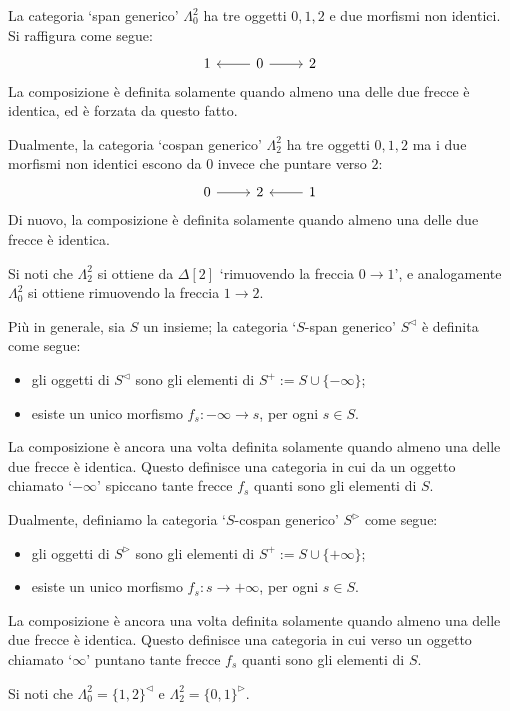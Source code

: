 \begin{example}\label{ex_spancospan}
La categoria `span generico' $\Lambda^2_0$ ha tre oggetti $0,1,2$ e due morfismi non identici. Si raffigura come segue:
\[\begin{tikzcd}
	1 & 0 \ar[r]\ar[l] & 2
\end{tikzcd}\]
La composizione è definita solamente quando almeno una delle due frecce è identica, ed è forzata da questo fatto.

Dualmente, la categoria `cospan generico' $\Lambda^2_2$ ha tre oggetti $0,1,2$ ma i due morfismi non identici escono da $0$ invece che puntare verso $2$:
\[\begin{tikzcd}
	0\ar[r] & 2 & 1\ar[l]
\end{tikzcd}\]
Di nuovo, la composizione è definita solamente quando almeno una delle due frecce è identica.

Si noti che $\Lambda^2_2$ si ottiene da $\Delta[2]$ `rimuovendo la freccia $0\to 1$', e analogamente $\Lambda^2_0$ si ottiene rimuovendo la freccia $1\to 2$.

Più in generale, sia $S$ un insieme; la categoria `$S$-span generico' $S^\lhd$ è definita come segue:
\begin{itemize}
	\item gli oggetti di $S^\lhd$ sono gli elementi di $S^+ := S\cup \{-\infty\}$;
	\item esiste un unico morfismo $f_s : -\infty\to s$, per ogni $s\in S$.
\end{itemize}
La composizione è ancora una volta definita solamente quando almeno una delle due frecce è identica. Questo definisce una categoria in cui da un oggetto chiamato `$-\infty$' spiccano tante frecce $f_s$ quanti sono gli elementi di $S$.

Dualmente, definiamo la categoria `$S$-cospan generico' $S^\rhd$ come segue:
\begin{itemize}
	\item gli oggetti di $S^\rhd$ sono gli elementi di $S^+ := S\cup \{+\infty\}$;
	\item esiste un unico morfismo $f_s : s\to+\infty$, per ogni $s\in S$.
\end{itemize}
La composizione è ancora una volta definita solamente quando almeno una delle due frecce è identica. Questo definisce una categoria in cui verso un oggetto chiamato `$\infty$' puntano tante frecce $f_s$ quanti sono gli elementi di $S$.

Si noti che $\Lambda^2_0=\{1,2\}^\lhd$ e $\Lambda^2_2=\{0,1\}^\rhd$.
\end{example}
